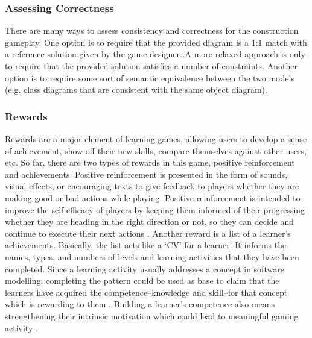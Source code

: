 \documentclass[conference]{IEEEtran}
\begin{document}
\subsubsection{Assessing Correctness} 
\label{Assessing Correctness} 
There are many ways to assess consistency and correctness for the construction gameplay. One option is to require that the provided diagram is a 1:1 match with a reference solution given by the game designer. A more relaxed approach is only to require that the provided solution satisfies a number of constraints. Another option is to require some sort of semantic equivalence between the two models (e.g. class diagrams that are consistent with the same object diagram). 

\subsubsection{Rewards}
\label{Rewards}
Rewards are a major element of learning games, allowing users to develop a sense of achievement, show off their new skills, compare themselves against other users, etc. So far, there are two types of rewards in this game, positive reinforcement and achievements. Positive reinforcement is presented in the form of sounds, visual effects, or encouraging texts to give feedback to players whether they are making good or bad actions while playing. Positive reinforcement is intended to improve the self-efficacy of players by keeping them informed of their progressing whether they are heading in the right direction or not, so they can decide and continue to execute their next actions \cite{richter2015studying}. Another reward is a list of a learner's achievements. Basically, the list acts like a `CV' for a learner. It informs the names, types, and numbers of levels and learning activities that they have been completed. Since a learning activity usually addresses a concept in software modelling, completing the pattern could be used as base to claim that the learners have acquired the competence--knowledge and skill--for that concept which is rewarding to them \cite{richter2015studying}. Building a learner's competence also means strengthening their intrinsic motivation \cite{ryan2017self} which could lead to meaningful gaming activity \cite{nicholson2015recipe}.
\end{document}
